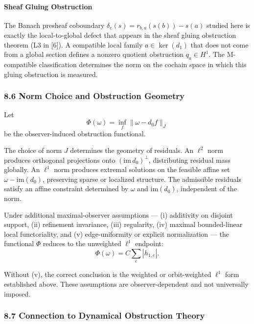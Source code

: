 \documentclass[
  11pt,
]{article}
\begin{document}
\paragraph{Sheaf Gluing Obstruction}\label{sheaf-gluing-obstruction}

The Banach presheaf coboundary \(\delta_e(s) = r_{b,a}(s(b)) - s(a)\) studied here is exactly the local-to-global defect that appears in the sheaf gluing obstruction theorem (L3 in {[}6{]}). A compatible local family \(a \in \ker(d_1)\) that does not come from a global section defines a nonzero quotient obstruction \(q_a \in H^1\). The M-compatible classification determines the norm on the cochain space in which this gluing obstruction is measured.

\subsubsection{8.6 Norm Choice and Obstruction Geometry}\label{norm-choice-and-obstruction-geometry}

Let
\[\Phi(\omega) = \inf_f \|\omega - d_0 f\|_J\]
be the observer-induced obstruction functional.

The choice of norm \(J\) determines the geometry of residuals. An \(\ell^2\) norm produces orthogonal projections onto \((\mathrm{im}\, d_0)^\perp\), distributing residual mass globally. An \(\ell^1\) norm produces extremal solutions on the feasible affine set \(\omega - \mathrm{im}(d_0)\), preserving sparse or localized structure. The admissible residuals satisfy an affine constraint determined by \(\omega\) and \(\mathrm{im}(d_0)\), independent of the norm.

Under additional maximal-observer assumptions --- (i) additivity on disjoint support, (ii) refinement invariance, (iii) regularity, (iv) maximal bounded-linear local functoriality, and (v) edge-uniformity or explicit normalization --- the functional \(\Phi\) reduces to the unweighted \(\ell^1\) endpoint:
\[\Phi(\omega) = C \sum_e |h_{1,e}|.\]

Without (v), the correct conclusion is the weighted or orbit-weighted \(\ell^1\) form established above. These assumptions are observer-dependent and not universally imposed.

\subsubsection{8.7 Connection to Dynamical Obstruction Theory}\label{connection-to-dynamical-obstruction-theory}
\end{document}
